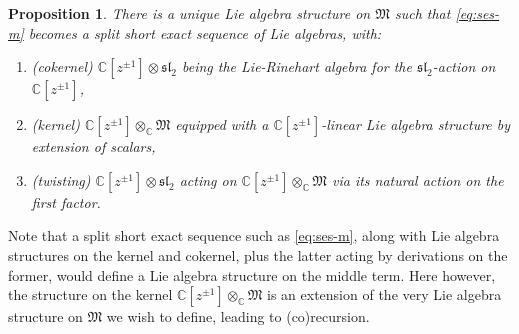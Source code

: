 \documentclass{article}
\def\fsl{\mathfrak{sl}}
\def\fM{\mathfrak{M}}
\def\CC{\mathbb{C}}
\newtheorem{prop}{Proposition}
\theoremstyle{definition}
\begin{document}
\begin{prop}\label{pro:m}
        There is a unique Lie algebra structure on $\fM$ such that
        \eqref{eq:ses-m} becomes a split short exact sequence of Lie algebras, with:
        \begin{enumerate}
                \item (cokernel) $\CC[z^{\pm1}]\otimes\fsl_2$ being the Lie-Rinehart algebra for the $\fsl_2$-action on 
                        $\CC[z^{\pm1}]$,
                \item (kernel) $\CC[z^{\pm1}]\otimes_\CC\fM$ equipped with a $\CC[z^{\pm1}]$-linear
                       Lie algebra structure by extension of scalars,
                \item  (twisting) $\CC[z^{\pm1}]\otimes\fsl_2$ acting on $\CC[z^{\pm1}]\otimes_\CC\fM$
                       via its natural action on the first factor.
        \end{enumerate}
\end{prop}
        Note that a split short exact sequence such as \eqref{eq:ses-m},
        along with Lie algebra structures on the kernel and cokernel,
        plus the latter acting by derivations on the former,
        would define a Lie algebra structure on the middle term.
        Here however, the structure on the kernel $\CC[z^{\pm1}]\otimes_\CC\fM$
        is an extension of the very Lie algebra structure on $\fM$ we wish
        to define, leading to (co)recursion.
\end{document}
